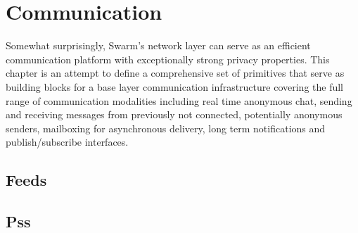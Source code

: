 \section{Communication}\label{sec:messaging}


Somewhat surprisingly, Swarm's network layer can serve as  an efficient  communication platform with exceptionally strong privacy properties. This chapter is an attempt to define a comprehensive set of primitives that serve as building blocks for a base layer communication infrastructure covering the full range of communication modalities including real time anonymous chat, sending and receiving messages from previously not connected, potentially anonymous senders, mailboxing for asynchronous delivery, long term notifications and  publish/subscribe interfaces. 

\subsection{Feeds}\label{sec:feeds-ux}
\subsection{Pss}\label{sec:pss-ux}


